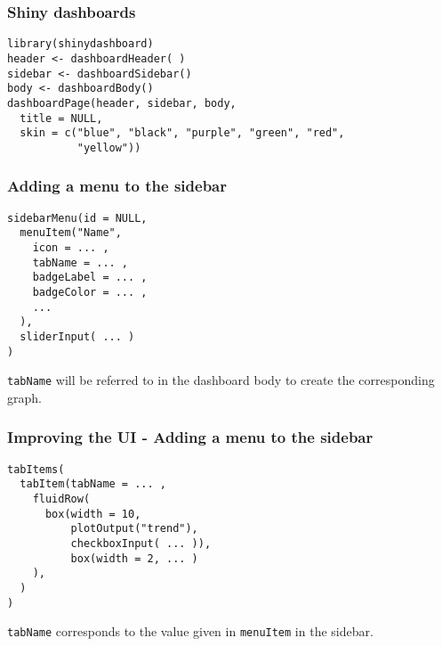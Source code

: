 \documentclass{beamer}
\begin{document}
	\begin{frame}[fragile]
		\frametitle{Shiny dashboards}
		
		\begin{exampleblock}{}
		\begin{BVerbatim}
library(shinydashboard)
header <- dashboardHeader( )
sidebar <- dashboardSidebar()
body <- dashboardBody()
dashboardPage(header, sidebar, body,
  title = NULL,
  skin = c("blue", "black", "purple", "green", "red",
           "yellow"))
		\end{BVerbatim}
		\end{exampleblock}{}

	\end{frame}

	\begin{frame}[fragile]
		\frametitle{Adding a menu to the sidebar}
		
		\begin{exampleblock}{}
		\begin{BVerbatim}
sidebarMenu(id = NULL,
  menuItem("Name",
    icon = ... ,
    tabName = ... ,
    badgeLabel = ... ,
    badgeColor = ... ,
    ...
  ),
  sliderInput( ... )
)
		\end{BVerbatim}
		\end{exampleblock}{}

		\vspace{1em}

		\verb|tabName| will be referred to in the dashboard body to create the corresponding graph.

	\end{frame}

	\begin{frame}[fragile]
		\frametitle{Improving the UI - Adding a menu to the sidebar}
		
		\begin{exampleblock}{}
		\begin{BVerbatim}
tabItems(
  tabItem(tabName = ... ,
    fluidRow(
      box(width = 10,
          plotOutput("trend"),
          checkboxInput( ... )),
          box(width = 2, ... )
    ),
  )
)
		\end{BVerbatim}
		\end{exampleblock}{}

		\vspace{1em}

		\verb|tabName| corresponds to the value given in \verb|menuItem| in the sidebar.

	\end{frame}
\end{document}
